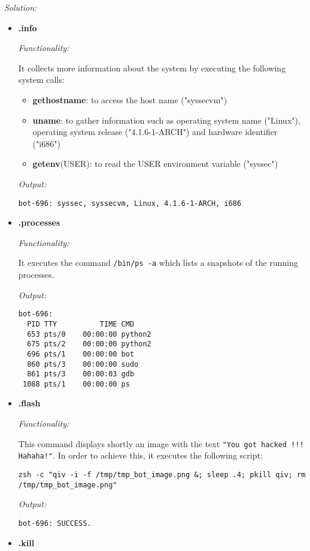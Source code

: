 \documentclass[a4paper,11pt]{article}
\newenvironment{solution}%
{\par{\noindent\small\textit{Solution:}}\vspace{-12pt}\begin{framed}}%
{\end{framed}\par}
\begin{document}
\ifsolution
\begin{solution}
\begin {itemize} 
\item \textbf{.info}

\emph{Functionality:}

It collects more information about the system by executing 
the following system calls:

\begin{itemize}
\item \textbf{gethostname}: to access the host name ("syssecvm")
\item \textbf{uname}: to gather information such as operating system name ("Linux"), operating system release ("4.1.6-1-ARCH") and hardware identifier ("i686")
\item \textbf{getenv}(USER): to read the USER environment variable ("syssec")
\end{itemize}

\emph{Output:}

\verb|bot-696: syssec, syssecvm, Linux, 4.1.6-1-ARCH, i686|

\item \textbf{.processes}

\emph{Functionality:}

It executes the command \texttt{/bin/ps -a} which lists a snapshots of the running processes.

\emph{Output:}

\begin{lstlisting}
bot-696: 
  PID TTY          TIME CMD
  653 pts/0    00:00:00 python2
  675 pts/2    00:00:00 python2
  696 pts/1    00:00:00 bot
  860 pts/3    00:00:00 sudo
  861 pts/3    00:00:03 gdb
 1088 pts/1    00:00:00 ps
\end{lstlisting}

\item \textbf{.flash}

\emph{Functionality:}

This command displays shortly an image with the text \verb|"You got hacked !!! Hahaha!"|. In order to 
achieve this, it executes the following script:  

\verb|zsh -c "qiv -i -f /tmp/tmp_bot_image.png &; sleep .4; pkill qiv; rm /tmp/tmp_bot_image.png"|

\emph{Output:}

\verb|bot-696: SUCCESS.|

\item \textbf{.kill}


\end{itemize}
\end{solution}
\end{document}
